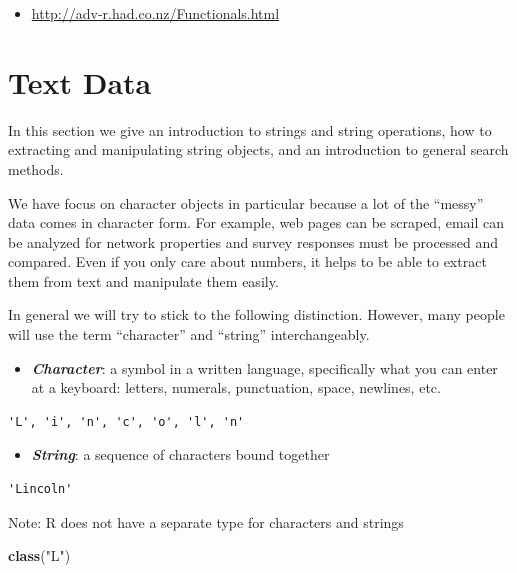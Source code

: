 \documentclass[
]{book}
\newenvironment{Shaded}{\begin{snugshade}}{\end{snugshade}}
\newcommand{\KeywordTok}[1]{\textcolor[rgb]{0.13,0.29,0.53}{\textbf{#1}}}
\newcommand{\NormalTok}[1]{#1}
\newcommand{\StringTok}[1]{\textcolor[rgb]{0.31,0.60,0.02}{#1}}
\providecommand{\tightlist}{%
  \setlength{\itemsep}{0pt}\setlength{\parskip}{0pt}}
\begin{document}
\begin{itemize}
\tightlist
\item
  \url{http://adv-r.had.co.nz/Functionals.html}
\end{itemize}

\hypertarget{text-data}{%
\chapter{Text Data}\label{text-data}}

In this section we give an introduction to strings and string operations, how to extracting and manipulating string objects, and an introduction to general search methods.

We have focus on character objects in particular because a lot of the ``messy'' data comes in character form. For example, web pages can be scraped, email can be analyzed for network properties and survey responses must be processed and compared. Even if you only care about numbers, it helps to be able to extract them from text and manipulate them easily.

In general we will try to stick to the following distinction. However, many people will use the term ``character'' and ``string'' interchangeably.

\begin{itemize}
\tightlist
\item
  \textbf{\emph{Character}}: a symbol in a written language, specifically what you can enter at a keyboard: letters, numerals, punctuation, space, newlines, etc.
\end{itemize}

\begin{verbatim}
'L', 'i', 'n', 'c', 'o', 'l', 'n'
\end{verbatim}

\begin{itemize}
\tightlist
\item
  \textbf{\emph{String}}: a sequence of characters bound together
\end{itemize}

\begin{verbatim}
'Lincoln'
\end{verbatim}

Note: R does not have a separate type for characters and strings

\begin{Shaded}
\begin{Highlighting}[]
\KeywordTok{class}\NormalTok{(}\StringTok{"L"}\NormalTok{)}
\end{Highlighting}
\end{Shaded}
\end{document}
